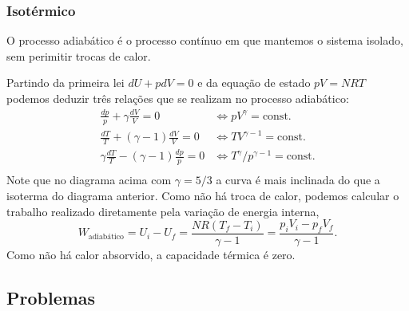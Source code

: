 \subsubsection{Isotérmico}

O processo adiabático é o processo contínuo em que mantemos o sistema isolado,
sem perimitir trocas de calor.
\begin{figure}[H]
    \centering
\end{figure}
Partindo da primeira lei $dU+pdV=0$ e da equação de estado $pV=NRT$ podemos
deduzir três relações que se realizam no processo adiabático:
\begin{align*}
    \frac{dp}{p}+\gamma\frac{dV}{V}=0&\Leftrightarrow pV^\gamma=\text{const.}\\
    \frac{dT}{T}+(\gamma-1)\frac{dV}{V}=0&\Leftrightarrow TV^{\gamma-1}=
    \text{const.}\\
    \gamma\frac{dT}{T}-(\gamma-1)\frac{dp}{p}=
    0&\Leftrightarrow T^\gamma/p^{\gamma-1}=\text{const.}\\
\end{align*}
Note que no diagrama acima com $\gamma=5/3$ a curva é mais inclinada do que a
isoterma do diagrama anterior. Como não há troca de calor, podemos calcular o
trabalho realizado diretamente pela variação de energia interna,
$$W_\text{adiabático}=U_i-U_f=\frac{NR(T_f-T_i)}{\gamma-1}
=\frac{p_iV_i-p_fV_f}{\gamma-1}.$$
Como não há calor absorvido, a capacidade térmica é zero.

\subsection{Problemas}

